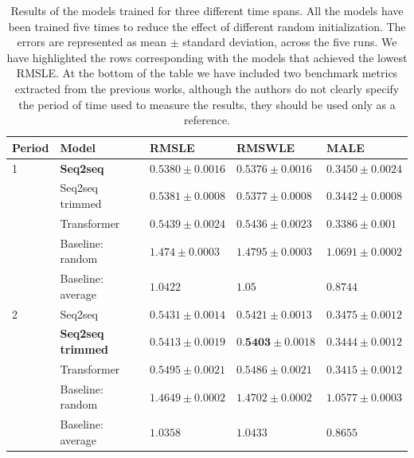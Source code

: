 \begin{table}[!h]
\scriptsize
\caption{Results of the models trained for three different time spans. All the models have been trained five times to reduce the effect of different random initialization. The errors are represented as mean $\pm$ standard deviation, across the five runs. We have highlighted the rows corresponding with the models that achieved the lowest RMSLE. At the bottom of the table we have included two benchmark metrics extracted from the previous works, although the authors do not clearly specify the period of time used to measure the results, they should be used only as a reference.}
	\label{tab:results}
	\centering
	\begin{tabular}{lllll}
		\hline
		Period    & Model                     & RMSLE                          & RMSWLE                         & MALE                           \\ \hline
		1         & \textbf{Seq2seq}          & $ \mathbf{0.5380 \pm 0.0016} $ & $ \mathbf{0.5376 \pm 0.0016 }$ & $  \mathbf{0.3450 \pm 0.0024}$ \\
         & Seq2seq trimmed           & $ 0.5381 \pm 0.0008 $          & $ 0.5377 \pm 0.0008 $          & $ 0.3442 \pm 0.0008 $          \\
         & Transformer               & $ 0.5439 \pm 0.0024 $          & $ 0.5436 \pm 0.0023 $          & $ 0.3386 \pm 0.001 $           \\
         & Baseline: random          & $ 1.474 \pm 0.0003 $           & $ 1.4795 \pm 0.0003 $          & $ 1.0691 \pm 0.0002 $          \\
         & Baseline: average         & $ 1.0422$                      & $ 1.05$                        & $ 0.8744$                      \\ \hline
		2         & Seq2seq                   & $ 0.5431 \pm 0.0014 $          & $ 0.5421 \pm 0.0013 $          & $ 0.3475 \pm 0.0012 $          \\
         & \textbf{Seq2seq trimmed } & $ \mathbf{0.5413 \pm 0.0019} $ & $ 0.\mathbf{5403 \pm 0.0018 }$ & $ \mathbf{0.3444 \pm 0.0012} $ \\
         & Transformer               & $ 0.5495 \pm 0.0021 $          & $ 0.5486 \pm 0.0021 $          & $ 0.3415 \pm 0.0012 $          \\
         & Baseline: random          & $ 1.4649 \pm 0.0002 $          & $ 1.4702 \pm 0.0002 $          & $ 1.0577 \pm 0.0003 $          \\
         & Baseline: average         & $ 1.0358$                      & $ 1.0433$                      & $ 0.8655$                      \\ \hline

\end{tabular}
\end{table}
